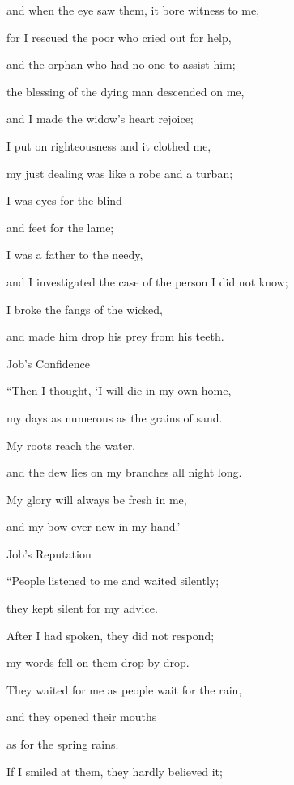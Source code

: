 {\par }{\Q and when the eye
saw
them, it bore witness to me,
\par }{\Q {}for
I rescued
the poor
who cried out for help,
\par }{\Q and the orphan
who had no
one to assist him;
\par }{\Q {}the blessing
of the dying man descended
on
me,
\par }{\Q and I made the widow’s
heart
rejoice;
\par }{\Q {}I put on
righteousness
and it clothed
me,

\par }{\Q my just dealing
was like a robe
and a turban;
\par }{\Q {}I
was eyes
for the blind
\par }{\Q and feet
for the lame;
\par }{\Q {}I was a father
to the needy,
\par }{\Q and I
investigated
the case
of the person I did not
know;
\par }{\Q {}I broke
the fangs
of the wicked,
\par }{\Q and made him drop
his prey
from his teeth.
\par }{\SH Job’s Confidence
\par }{\Q {}“Then I thought,
‘I will die
in my own home,

\par }{\Q my
days
as numerous
as the grains
of sand.
\par }{\Q {}My roots
reach
the water,
\par }{\Q and the dew
lies on my branches
all night long.
\par }{\Q {}My glory
will always be fresh
in me,
\par }{\Q and my bow
ever new
in my hand.’
\par }{\SH Job’s Reputation
\par }{\Q {}“People listened
to me
and waited
silently;
\par }{\Q they kept silent
for my advice.
\par }{\Q {}After
I had
spoken,
they did not
respond;
\par }{\Q my words
fell on them drop
by drop.
\par }{\Q {}They waited
for me as people wait for the rain,
\par }{\Q and they opened
their mouths
\par }{\Q as for the spring rains.
\par }{\Q {}If I smiled
at
them, they hardly
believed
it;

}
